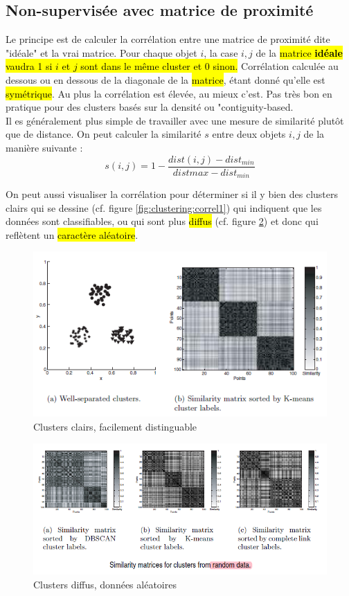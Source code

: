 \documentclass[letterpaper, 12pt]{article}
\newcommand{\alinea}{
\hspace*{0.5cm}}
\begin{document}
		\subsection{Non-supervisée avec matrice de proximité}
			\alinea Le principe est de calculer la corrélation entre
				une matrice de proximité dite "idéale" et la vrai matrice.
				Pour chaque objet $i$, la case $i, j$ de la \hl{matrice
				\textbf{idéale} vaudra 1 si $i$ et $j$ sont dans le
				même cluster et 0 sinon.} Corrélation calculée au 
				dessous ou en dessous de la diagonale de la \hl{matrice},
				étant donné qu'elle est \hl{symétrique}. Au plus la
				corrélation est élevée, au mieux c'est. Pas très 
				bon en pratique pour des clusters basés sur la densité 
				ou "contiguity-based.\\
			\alinea Il es généralement plus simple de travailler avec
				une mesure de similarité plutôt que de distance.
				On peut calculer la similarité $s$ entre deux 
				objets $i, j$ de la manière suivante :
				$$ s(i, j) = 1-\frac{dist(i, j) - dist_{min}}%
				{dist{max} - dist_{min}} $$
			\alinea On peut aussi visualiser la corrélation pour déterminer
				si il y bien des clusters clairs qui se dessine (cf. 
				figure \ref{fig:clustering:correl1}) qui indiquent
				que les données sont classifiables, ou qui sont
				plus \hl{diffus} (cf. figure \ref{fig:clustering:correl2})
				et donc qui reflètent un \hl{caractère aléatoire}.
			\begin{figure}[H]
				\centering
				\includegraphics[scale=0.75]{Images/correl_1}
				\caption{Clusters clairs, facilement distinguable}
				\label{fig:clustering:correl2}
			\end{figure}\noindent
			\begin{figure}[H]
				\centering
				\includegraphics[scale=0.75]{Images/correl_2}
				\caption{Clusters diffus, données aléatoires}
				\label{fig:clustering:correl2}
			\end{figure}\noindent
\end{document}
